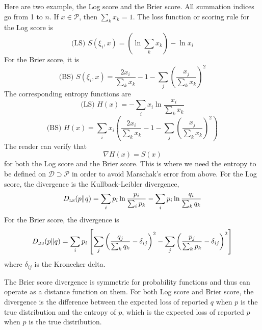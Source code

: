 \documentclass[12pt]{article}
\begin{document}
Here are two example, the Log score and the Brier score. All summation
indices go from 1 to $n$. If $x\in\mathcal{P}$, then
$\sum_{k}x_{k}=1$. The loss function or scoring rule for the Log score
is
\begin{equation}
  \label{eq:oneeraiw}
  \mbox{(LS) }S(\xi_{i},x)=\left(\ln\sum_{k}x_{k}\right)-\ln{}x_{i}
\end{equation}
For the Brier score, it is
\begin{equation}
  \label{eq:hiexaeji}
  \mbox{(BS) }S(\xi_{i},x)=\frac{2x_{i}}{\sum_{k}x_{k}}-1-\sum_{j}\left(\frac{x_{j}}{\sum_{k}x_{k}}\right)^{2}
\end{equation}
The corresponding entropy functions are
\begin{equation}
  \label{eq:yeuthohn}
  \mbox{(LS) }H(x)=-\sum_{i}{}x_{i}\ln\frac{x_{i}}{\sum_{k}x_{k}}
\end{equation}
\begin{equation}
  \label{eq:ahfooyai}
  \mbox{(BS) }H(x)=\sum_{i}{}x_{i}\left(\frac{2x_{i}}{\sum_{k}x_{k}}-1-\sum_{j}\left(\frac{x_{j}}{\sum_{k}x_{k}}\right)^2\right)
\end{equation}
The reader can verify that
\begin{equation}
  \label{eq:eikughoh}
  \nabla{}H(x)=S(x)
\end{equation}
for both the Log score and the Brier score. This is where we need the
entropy to be defined on $\mathcal{D}\supset\mathcal{P}$ in order to
avoid Marschak's error from above. For the Log score, the divergence
is the Kullback-Leibler divergence,
\begin{equation}
  \label{eq:engeequu}
  D_{\mbox{\tiny LS}}(p\|q)=\sum_{i}p_{i}\ln\frac{p_{i}}{\sum_{i}p_{k}}-\sum_{i}p_{i}\ln\frac{q_{i}}{\sum_{k}q_{k}}
\end{equation}
For the Brier score, the divergence is 
\begin{equation}
  \label{eq:aphooghi}
  D_{\mbox{\tiny BS}}(p\|q)=\sum_{i}p_{i}\left[\sum_{j}\left(\frac{q_{j}}{\sum_{k}q_{k}}-\delta_{ij}\right)^{2}-\sum_{j}\left(\frac{p_{j}}{\sum_{k}p_{k}}-\delta_{ij}\right)^{2}\right]
\end{equation}
where $\delta_{ij}$ is the Kronecker delta.

The Brier score divergence is symmetric for probability functions and
thus can operate as a distance function on them. For both Log score
and Brier score, the divergence is the difference between the expected
loss of reported $q$ when $p$ is the true distribution and the entropy
of $p$, which is the expected loss of reported $p$ when $p$ is the
true distribution.
\end{document}
